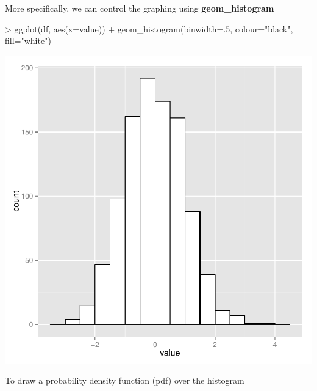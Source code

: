 \documentclass{article}
\begin{document}
More specifically, we can control the graphing using \textbf{geom\_histogram}

\begin{Schunk}
\begin{Sinput}
> ggplot(df, aes(x=value)) + geom_histogram(binwidth=.5, colour="black", fill="white")
\end{Sinput}
\end{Schunk}
\includegraphics{cookbook-033}

To draw a probability density function (pdf) over the histogram
\end{document}
